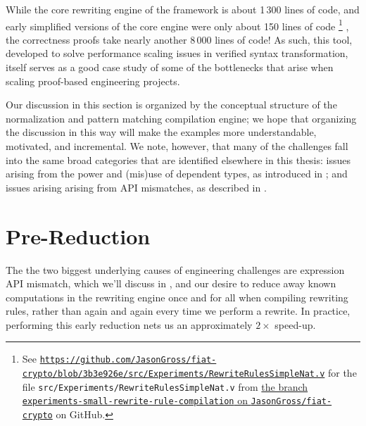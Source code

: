 While the core rewriting engine of the framework is about 1\,300 lines of code, and early simplified versions of the core engine were only about 150 lines of code%
\bgroup
\allowbreakafterslash
\footnote{%
  See \href{https://web.archive.org/web/20200716002534/https://github.com/JasonGross/fiat-crypto/blob/3b3e926e4186caa1a4003c81c65dad0a1c04b43d/src/Experiments/RewriteRulesSimpleNat.v}{\texttt{https://github.com/JasonGross/fiat-crypto/blob/3b3e926e/src/Experiments/RewriteRulesSimpleNat.v}} for the file \texttt{src/Experiments/RewriteRulesSimpleNat.v} from \href{https://github.com/JasonGross/fiat-crypto/tree/experiments-small-rewrite-rule-compilation}{the branch \texttt{experiments-small-rewrite-rule-compilation} on \texttt{JasonGross/fiat-crypto}} on GitHub.%
}%
\egroup
, the correctness proofs take nearly another 8\,000 lines of code!
As such, this tool, developed to solve performance scaling issues in verified syntax transformation, itself serves as a good case study of some of the bottlenecks that arise when scaling proof-based engineering projects.

Our discussion in this section is organized by the conceptual structure of the normalization and pattern matching compilation engine;
we hope that organizing the discussion in this way will make the examples more understandable, motivated, and incremental.
We note, however, that many of the challenges fall into the same broad categories that are identified elsewhere in this thesis:
issues arising from the power and (mis)use of dependent types, as introduced in ;
and issues arising arising from API mismatches, as described in .

\section{Pre-Reduction}\label{sec:rewriting-more:pre-reduction}
The the two biggest underlying causes of engineering challenges are expression API mismatch, which we'll discuss in , and our desire to reduce away known computations in the rewriting engine once and for all when compiling rewriting rules, rather than again and again every time we perform a rewrite.
In practice, performing this early reduction nets us an approximately $2\times$ speed-up.

